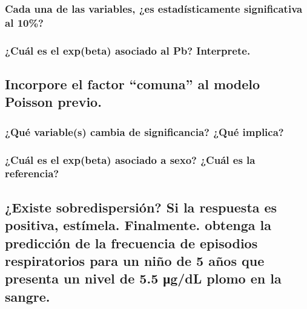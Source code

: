 \documentclass[
  english,
  10pt,
  letterpaper,
  DIV=11,
  numbers=noendperiod]{scrartcl}
\begin{document}
\subsubsection{Cada una de las variables, ¿es estadísticamente
significativa al
10\%?}\label{cada-una-de-las-variables-es-estaduxedsticamente-significativa-al-10}

\subsubsection{¿Cuál es el exp(beta) asociado al Pb?
Interprete.}\label{cuuxe1l-es-el-expbeta-asociado-al-pb-interprete.}

\subsection{Incorpore el factor ``comuna'' al modelo Poisson
previo.}\label{incorpore-el-factor-comuna-al-modelo-poisson-previo.}

\subsubsection{¿Qué variable(s) cambia de significancia? ¿Qué
implica?}\label{quuxe9-variables-cambia-de-significancia-quuxe9-implica}

\subsubsection{¿Cuál es el exp(beta) asociado a sexo? ¿Cuál es la
referencia?}\label{cuuxe1l-es-el-expbeta-asociado-a-sexo-cuuxe1l-es-la-referencia}

\subsection{¿Existe sobredispersión? Si la respuesta es positiva,
estímela. Finalmente. obtenga la predicción de la frecuencia de
episodios respiratorios para un niño de 5 años que presenta un nivel de
5.5 μg/dL plomo en la
sangre.}\label{existe-sobredispersiuxf3n-si-la-respuesta-es-positiva-estuxedmela.-finalmente.-obtenga-la-predicciuxf3n-de-la-frecuencia-de-episodios-respiratorios-para-un-niuxf1o-de-5-auxf1os-que-presenta-un-nivel-de-5.5-ux3bcgdl-plomo-en-la-sangre.}
\end{document}
